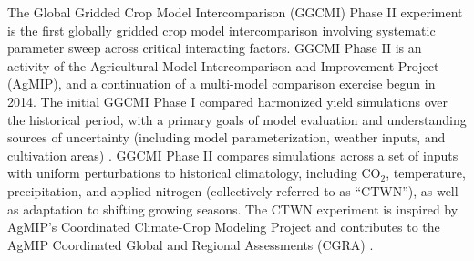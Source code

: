 \documentclass[gmd, manuscript]{copernicus} %
\begin{document}
The Global Gridded Crop Model Intercomparison (GGCMI) Phase II experiment is the first globally gridded crop model intercomparison involving systematic parameter sweep across critical interacting factors.
GGCMI Phase II is an activity of the Agricultural Model Intercomparison and Improvement Project (AgMIP), 
and a continuation of a multi-model comparison exercise begun in 2014. 
The initial GGCMI Phase I compared harmonized yield simulations over the historical period, with a primary goals of model evaluation and understanding sources of uncertainty (including model parameterization, weather inputs, and cultivation areas) \citep{Elliott2015, muller_global_2017, folberth2016, porwollik_spatial_2016}. 
GGCMI Phase II compares simulations across a set of inputs with uniform perturbations to historical climatology,  
including CO$_2$, temperature, precipitation, and applied nitrogen (collectively referred to as ``CTWN''), as well as adaptation to shifting growing seasons. 
The CTWN experiment is inspired by AgMIP's Coordinated Climate-Crop Modeling Project \citep[C3MP][]{ruane2014,mcdermid2015agmip} and contributes to the AgMIP Coordinated Global and Regional Assessments (CGRA) \citep{ruane2018, rosenzweig2018}. 
\end{document}
